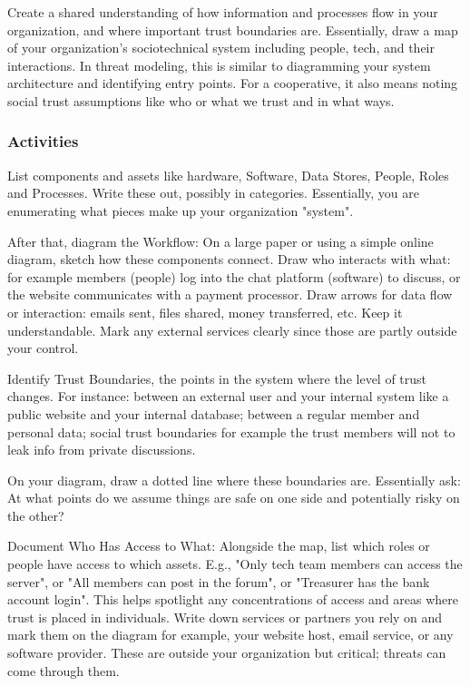 Create a shared understanding of how information and processes flow in your
organization, and where important trust boundaries are. Essentially, draw a map of your
organization's sociotechnical system including people, tech, and their
interactions. In threat modeling, this is similar to diagramming your system
architecture and identifying entry points. For a cooperative, it also means
noting social trust assumptions like who or what we trust and in what ways.

\subsubsection{Activities}

List components and assets like hardware, Software, Data Stores,
People, Roles and Processes. Write these out, possibly in categories.
Essentially, you are enumerating what pieces make up your organization "system".

After that, diagram the Workflow: On a large paper or using a simple online diagram,
sketch how these components connect. Draw who interacts with what:
for example members (people) log into the chat platform (software) to discuss,
or the website communicates with a payment processor. Draw arrows for data flow
or interaction: emails sent, files shared, money transferred, etc. Keep it
understandable. Mark any external services clearly since those are partly
outside your control.

Identify Trust Boundaries, the points in the system where the
level of trust changes. For instance: between an external user and your
internal system like a public website and your internal database; between
a regular member and personal data; social trust boundaries for example
the trust members will not to leak info from private discussions.

On your diagram, draw a dotted line where these boundaries are.
Essentially ask: At what points do we assume things are safe on one side
and potentially risky on the other?

Document Who Has Access to What: Alongside the map, list which roles or people have
access to which assets. E.g., "Only tech team members can access the server", or "All
members can post in the forum", or "Treasurer has the bank account login". This
helps spotlight any concentrations of access and areas where trust is placed in
individuals. Write down services or partners you rely on and mark them on the
diagram for example, your website host, email service, or any software
provider. These are outside your organization but critical; threats can come through them.

